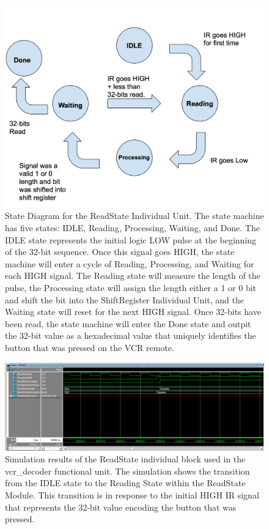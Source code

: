 \documentclass[a4paper]{article}
\begin{document}
\begin{figure}[h]
  \centering
    \includegraphics[width=.98\textwidth]{images/ReadState_state_diagram.png}
	\caption{State Diagram for the ReadState Individual Unit. The state machine has five states: IDLE, Reading, Processing, Waiting, and Done.
  The IDLE state represents the initial logic LOW pulse at the beginning of the 32-bit sequence. Once this signal goes HIGH, the state machine will enter a cycle of Reading, Processing, and Waiting for each HIGH signal. The Reading state will measure the length of the pulse, the Processing state will assign the length either a 1 or 0 bit and shift the bit into the ShiftRegister Individual Unit, and the Waiting state will reset for the next HIGH signal. Once 32-bits have been read, the state machine will enter the Done state and outpit the 32-bit value as a hexadecimal value that uniquely identifies the button that was pressed on the VCR remote.}
    \label{fig:top-level-sim}
\end{figure}
\begin{figure}[h]
  \centering
  \includegraphics[width=.98\textwidth]{sims/vcr_testing/moduleTests/ReadState/IDLE_to_READING_Transition.png}
  \caption{Simulation results of the ReadState individual block used in the vcr\_decoder functional unit. The simulation shows the transition from the IDLE state to the Reading State within the ReadState Module. This transition is in response to the initial HIGH IR signal that represents the 32-bit value encoding the button that was pressed.}
    \label{fig:individual-1-2-sim}
\end{figure}
\end{document}
